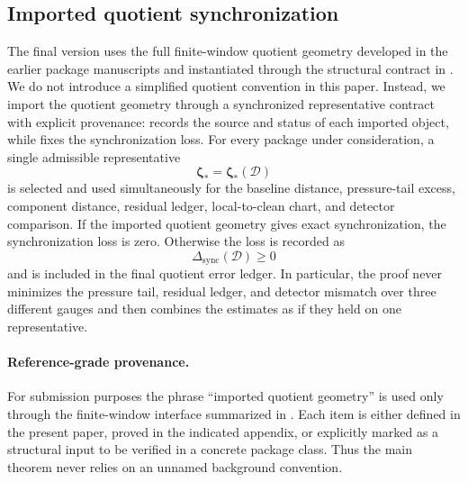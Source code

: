 \documentclass[11pt]{article}
\numberwithin{equation}{section}
\theoremstyle{definition}
\theoremstyle{remark}
\newcommand{\sync}{\mathrm{sync}}
\newcommand{\calD}{\mathcal D}
\newcommand{\bzeta}{\boldsymbol\zeta}
\begin{document}
\subsection*{Imported quotient synchronization}

The final version uses the full finite-window quotient geometry developed in the earlier package manuscripts \cite{YuSchur2026,YuInvisible2026,YuCriticalLedgers2026,YuSingularityAuditTransfer2026,YuComputationalAntiPhantom2026} and instantiated through the structural contract in .  We do not introduce a simplified quotient convention in this paper.  Instead, we import the quotient geometry through a synchronized representative contract with explicit provenance:  records the source and status of each imported object, while  fixes the synchronization loss.  For every package under consideration, a single admissible representative
\[
        \bzeta_* = \bzeta_*(\calD)
\]
is selected and used simultaneously for the baseline distance, pressure-tail excess, component distance, residual ledger, local-to-clean chart, and detector comparison.  If the imported quotient geometry gives exact synchronization, the synchronization loss is zero.  Otherwise the loss is recorded as
\[
        \Delta_{\sync}(\calD)\ge 0
\]
and is included in the final quotient error ledger.  In particular, the proof never minimizes the pressure tail, residual ledger, and detector mismatch over three different gauges and then combines the estimates as if they held on one representative.


\paragraph{Reference-grade provenance.}
For submission purposes the phrase ``imported quotient geometry'' is used only through the finite-window interface summarized in .  Each item is either defined in the present paper, proved in the indicated appendix, or explicitly marked as a structural input to be verified in a concrete package class.  Thus the main theorem never relies on an unnamed background convention.
\end{document}
